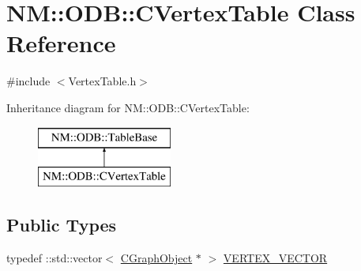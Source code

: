 \hypertarget{class_n_m_1_1_o_d_b_1_1_c_vertex_table}{}\section{N\+M\+:\+:O\+D\+B\+:\+:C\+Vertex\+Table Class Reference}
\label{class_n_m_1_1_o_d_b_1_1_c_vertex_table}


{\ttfamily \#include $<$Vertex\+Table.\+h$>$}

Inheritance diagram for N\+M\+:\+:O\+D\+B\+:\+:C\+Vertex\+Table\+:\begin{figure}[H]
\begin{center}
\leavevmode
\includegraphics[height=2.000000cm]{class_n_m_1_1_o_d_b_1_1_c_vertex_table}
\end{center}
\end{figure}
\subsection*{Public Types}
\begin{DoxyCompactItemize}
\item 
typedef \+::std\+::vector$<$ \hyperlink{class_n_m_1_1_o_d_b_1_1_c_graph_object}{C\+Graph\+Object} $\ast$ $>$ \hyperlink{class_n_m_1_1_o_d_b_1_1_c_vertex_table_aad307ea0f7106397e4da74c082c3aaf7}{V\+E\+R\+T\+E\+X\+\_\+\+V\+E\+C\+T\+O\+R}
\end{DoxyCompactItemize}
